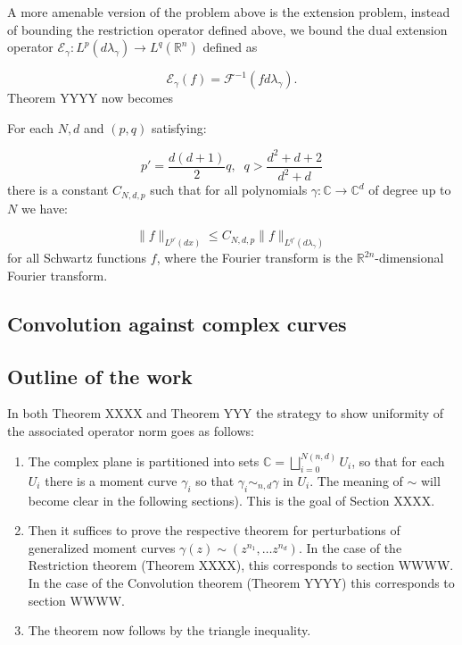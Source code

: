 	A more amenable version of the problem above is the extension problem, instead of bounding the restriction operator defined above, we bound the dual extension operator $\mathcal E_\gamma: L^p(d\lambda_\gamma) \to L^q(\mathbb R^n)$ defined as

	\begin{equation}
		\mathcal E_\gamma(f) = \mathcal F^{-1}(f d\lambda_\gamma).
	\end{equation}
	Theorem YYYY now becomes 
	\addtocounter{thm}{-1}
	\begin{thm}
		For each $N,d$ and $(p,q)$ satisfying:

		\begin{equation}
			p' = \frac{d(d+1)}{2} q, \;\; q> \frac{d^2+d+2}{d^2+d}
		\end{equation}
		there is a constant $C_{N,d,p}$ such that for all polynomials $\gamma: \mathbb C \to \mathbb C^d$ of degree up to $N$ we have:

		\begin{equation}
			\|f\|_{L^{p'}(dx)} \le C_{N,d,p} \| f\|_{L^{q'}(d\lambda_\gamma)} 
		\end{equation}
		for all Schwartz functions $f$, where the Fourier transform is the $\mathbb R^{2n}$-dimensional Fourier transform.
	\end{thm}



	\subsection{Convolution against complex curves} %
	\label{sub:convolution_against_complex_curves}
	


	\subsection{Outline of the work} %
	\label{sub:outline_of_the_work}

	In both Theorem XXXX and Theorem YYY the strategy to show uniformity of the associated operator norm goes as follows:

	\begin{enumerate}
		\item The complex plane is partitioned into sets $\mathbb C = \bigsqcup_{i=0}^{N(n,d)} U_i$, so that for each $U_i$ there is a moment curve $\gamma_i$ so that $\gamma_i \sim_{n,d} \gamma$ in $U_i$. The meaning of $\sim$ will become clear in the following sections). This is the goal of Section XXXX. 

		\item Then it suffices to prove the respective theorem for perturbations of generalized moment curves $\gamma(z) \sim (z^{n_1}, \dots z^{n_d})$. In the case of the Restriction theorem (Theorem XXXX), this corresponds to section WWWW. In the case of the Convolution theorem (Theorem YYYY) this corresponds to section WWWW.

		\item The theorem now follows by the triangle inequality.
	\end{enumerate}



